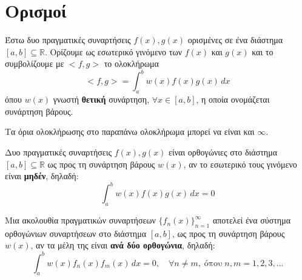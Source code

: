 


\renewcommand{\qedsymbol}{}

\pagestyle{vangelis}




\begin{center}
  \minibox{\large\bfseries \textcolor{Col1}{Ορθογωνιότητα Συναρτήσεων}}
\end{center}

\vspace{\baselineskip}



\section*{Ορισμοί}

\begin{dfn}
  Έστω δυο πραγματικές συναρτήσεις $ f(x), g(x) $ ορισμένες σε ένα διάστημα 
  $ [a,b] \subseteq \mathbb{R} $. Ορίζουμε ως \textcolor{Col1}{εσωτερικό γινόμενο} 
  των $ f(x) $ και $ g(x) $ και το συμβολίζουμε με $ <f,g> $ το ολοκλήρωμα
  \[
    <f,g> = \int _{a}^{b} w(x) f(x)g(x) \,{dx} 
  \] 
  όπου $ w(x) $ γνωστή \textbf{θετική} συνάρτηση, $ \forall x \in [a,b] $, η οποία 
  ονομάζεται \textcolor{Col1}{συνάρτηση βάρους}.
\end{dfn}

\begin{rem}
  Τα όρια ολοκλήρωσης στο παραπάνω ολοκλήρωμα μπορεί να είναι και $ \infty $.
\end{rem}

\begin{dfn}
  Δυο πραγματικές συναρτήσεις $ f(x), g(x) $ είναι \textcolor{Col1}{ορθογώνιες} 
  στο διάστημα $ [a,b] \subseteq \mathbb{R} $ ως προς τη συνάρτηση βάρους $ w(x) $, 
  αν το εσωτερικό τους γινόμενο είναι \textbf{μηδέν}, δηλαδή:
  \[
    \int _{a}^{b} w(x)f(x)g(x) \,{dx} = 0
  \] 
\end{dfn}

\begin{dfn}
  Μια ακολουθία πραγματικών συναρτήσεων $ \{ f_{n}(x) \}_{n=1}^{\infty} $ αποτελεί 
  ένα \textcolor{Col1}{σύστημα ορθογώνιων συναρτήσεων} στο διάστημα $ [a,b] $, 
  ως προς τη συνάρτηση βάρους $ w(x) $, αν τα μέλη της είναι 
  \textbf{ανά δύο ορθογώνια}, δηλαδή:
  \[
    \int _{a}^{b} w(x) f_{n}(x)f_{m}(x) \,{dx} = 0, \quad \forall n \neq m, \; 
    \text{όπου} \;  n,m = 1,2,3, \ldots
  \] 
\end{dfn}

